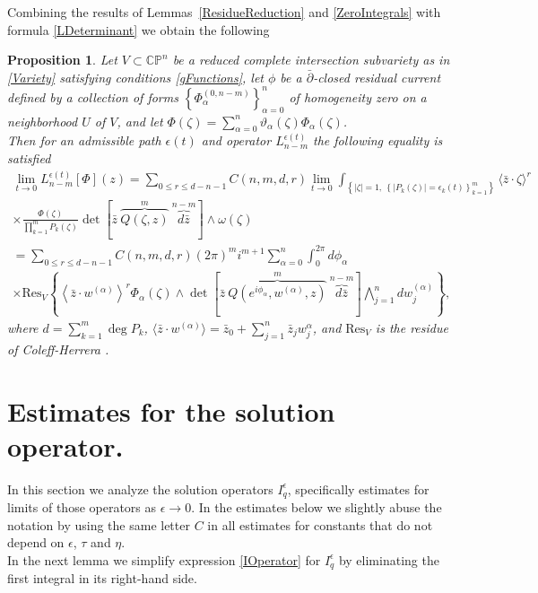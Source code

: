 \documentclass[11pt,reqno]{amsart}
\numberwithin{equation}{section}
\newtheorem{proposition}{Proposition}[section]
\begin{document}
\indent
Combining the results of Lemmas~\ref{ResidueReduction} and \ref{ZeroIntegrals}
with formula \eqref{LDeterminant} we obtain the following
\begin{proposition}\label{HodgeProjector} Let $V\subset {{\mathbb C}}{{\mathbb P}}^n$ be a reduced
complete intersection subvariety as in \eqref{Variety} satisfying conditions
\eqref{gFunctions}, let  $\phi$ be a $\bar\partial$-closed residual current defined
by a collection of forms $\left\{\Phi^{(0,n-m)}_{\alpha}\right\}_{\alpha=0}^n$
of homogeneity zero on a neighborhood $U$ of $V$,
and let $\Phi(\zeta)=\sum_{\alpha=0}^n\vartheta_{\alpha}(\zeta)\Phi_{\alpha}(\zeta)$.\\
\indent
Then for an admissible path $\epsilon(t)$ and operator $L_{n-m}^{\epsilon(t)}$
the following equality is satisfied
\begin{multline}\label{LResidue}
\lim_{t\to 0}L_{n-m}^{\epsilon(t)}\left[\Phi\right](z)
=\sum_{0\leq r\leq d-n-1}C(n,m,d,r)\lim_{t\to 0}\int_{\left\{|\zeta|=1,\
\left\{|P_k(\zeta)|=\epsilon_k(t)\right\}_{k=1}^m\right\}}
\langle{\bar z}\cdot\zeta\rangle^r\\
\times\frac{\Phi(\zeta)}{\prod_{k=1}^mP_k(\zeta)}
\det\left[{\bar z}\ \overbrace{Q(\zeta,z)}^{m}\
\overbrace{d{\bar z}}^{n-m}\right]\wedge\omega(\zeta)\\
=\sum_{0\leq r\leq d-n-1}C(n,m,d,r)\left(2\pi\right)^mi^{m+1}
\sum_{\alpha=0}^n\int_0^{2\pi}d\phi_{\alpha}\\
\times\text{Res}_V\left\{\left\langle{\bar z}\cdot w^{(\alpha)}
\right\rangle^r\Phi_{\alpha}(\zeta)
\wedge\det\left[{\bar z}\ \overbrace{Q(e^{i\phi_{\alpha}},w^{(\alpha)},z)}^{m}\
\overbrace{d{\bar z}}^{n-m}\right]\bigwedge_{j=1}^n dw^{(\alpha)}_j\right\},
\end{multline}
where $d=\sum_{k=1}^m\deg P_k$,
$\langle{\bar z}\cdot w^{(\alpha)}\rangle={\bar z}_0
+\sum_{j=1}^n{\bar z}_jw^{\alpha}_j$,
and $\mbox{Res}_V$ is the residue of Coleff-Herrera \cite{CH}.
\end{proposition}

\section{Estimates for the solution operator.}
\label{IEstimates}

\indent
In this section we analyze the solution operators $I_q^{\epsilon}$, specifically estimates for limits
of those operators as $\epsilon\to 0$. In the estimates below we slightly abuse the notation by
using the same letter $C$ in all estimates for constants that do not depend on $\epsilon$, $\tau$
and $\eta$.\\
\indent
In the next lemma we simplify expression \eqref{IOperator} for
$I_q^{\epsilon}$ by eliminating the first integral in its right-hand side.
\end{document}
